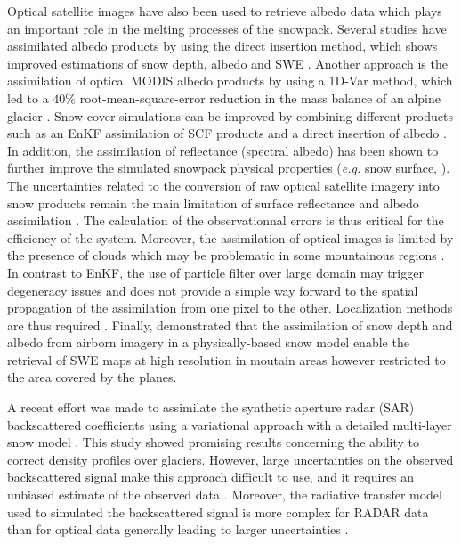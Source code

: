 \documentclass[utf8]{frontiersSCNS} %
\begin{document}
Optical satellite images have also been used to retrieve albedo data which plays an important role in the melting processes of the snowpack. Several studies have assimilated albedo products by using the direct insertion method, which shows improved estimations of snow depth, albedo and SWE  \citep{Malik_2012,Wang_2015}. Another approach is the assimilation of optical MODIS albedo products by using a 1D-Var method, which led to a $40 \%$ root-mean-square-error reduction in the mass balance of an alpine glacier \citep{Dumont_2012}. Snow cover simulations can be improved by combining different products such as an EnKF assimilation of SCF products and a direct insertion of albedo \citep{Xu_2016}. In addition, the assimilation of reflectance (spectral albedo) has been shown to further improve the simulated snowpack physical properties (\textit{e.g.} snow surface, \citealp{Charrois_2016}). The uncertainties related to the conversion of raw optical satellite imagery into snow products remain the main limitation of surface reflectance and albedo assimilation \citep{Zaitchik_2009,Hall_2010,DeLannoy_2012, Cluzet_2018}. The calculation of the observationnal errors is thus critical for the efficiency of the system.  Moreover, the assimilation of optical images is limited by the presence of clouds \citep{Hall_2007} which may be problematic in some mountainous regions \citep{Charrois_2016}. In contrast to EnKF, the use of particle filter over large domain may trigger degeneracy issues and does not provide a simple way forward to the spatial propagation of the assimilation from one pixel to the other. Localization methods are thus required \citep[e.g.][]{Farchi_2018}. Finally, \citet{Painter_2016} demonstrated that the assimilation of snow depth and albedo from airborn imagery in a physically-based snow model enable the retrieval of SWE maps at high resolution in moutain areas however restricted to the area covered by the planes. 

A recent effort was made to assimilate the synthetic aperture radar (SAR) backscattered coefficients using a variational approach with a detailed multi-layer snow model \citep{Phan_2014}. This study showed promising results concerning the ability to correct density profiles over glaciers. However, large uncertainties on the observed backscattered signal make this approach difficult to use, and it requires an unbiased estimate of the observed data \citep{Veyssiere_2019}. Moreover, the radiative transfer model used to simulated the backscattered signal is more complex for RADAR data than for optical data generally leading to larger uncertainties \citep{Picard_2018, Helmert_2018}. 
\end{document}
